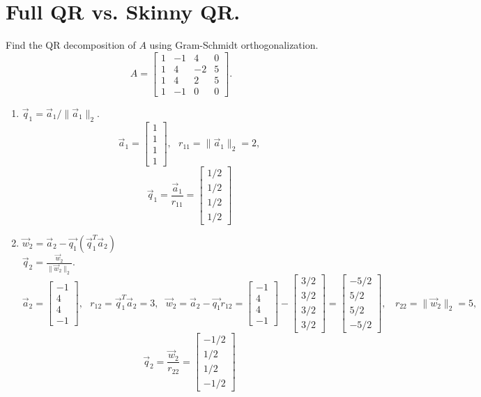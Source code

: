 \documentclass{article}
\newcommand{\norm}[1]{\|#1\|}
\newcommand{\normII}[1]{\norm{#1}_2}
\newcommand{\bmat}[1]{\begin{bmatrix}#1\end{bmatrix}}
\begin{document}
\section*{Full QR vs. Skinny QR.}
Find the QR decomposition of $A$ using Gram-Schmidt orthogonalization.
\[ A = \bmat{1 & -1 & 4 & 0 \\
			 1 & 4 & -2 & 5 \\
			 1 & 4 &  2 & 5  \\
			 1 & -1 & 0 & 0}. \]
\begin{enumerate}
\item $\vec q_1 = \vec a_1/\normII{\vec a_1}.$
\[ \vec a_1 = \bmat{1 \\ 1 \\ 1 \\ 1},\ \ \ r_{11} = \normII{\vec a_1} = 2, \] 
\[ \vec q_1 = \frac{\vec a_1}{r_{11}} = \bmat{1/2 \\ 1/2 \\ 1/2 \\ 1/2} \]

\item $\vec w_2 = \vec a_2 - \vec{q_1} (\vec q_1^T \vec a_2)$\\
$\vec q_2 = \frac{\vec w_2}{\normII{\vec w_2}}.$
\[ \vec a_2 = \bmat{-1 \\ 4 \\ 4 \\ -1},\ \ \ r_{12} = \vec q_1^T \vec a_2 = 3,\ \ \ \vec w_2 = \vec a_2 - \vec{q_1}r_{12} = \bmat{-1 \\ 4 \\ 4 \\ -1} - \bmat{3/2 \\ 3/2 \\ 3/2 \\ 3/2} = \bmat{-5/2 \\ 5/2 \\ 5/2 \\ -5/2},\ \ \ \ r_{22} = \normII{\vec w_2} = 5, \]
\[ \vec q_2 = \frac{\vec w_2}{r_{22}} = \bmat{-1/2 \\ 1/2 \\ 1/2 \\ -1/2} \]


\end{enumerate}
\end{document}
